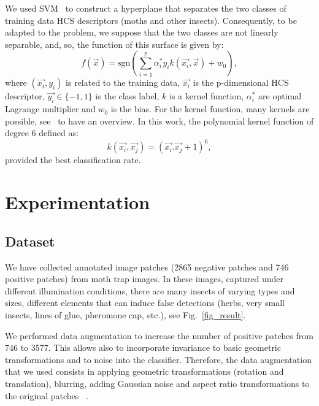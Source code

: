 \documentclass[a4paper,conference]{IEEEtran}
\begin{document}
We used SVM~\cite{cortes1995support} to construct a hyperplane that separates the two classes of training data HCS descriptors (moths and other insects).
Consequently, to be adapted to the problem, we suppose that the two classes are not linearly separable, and, so, the function of this surface is given by: 
\begin{equation}
    f(\vec{x}) = \text{sgn}(\sum_{i=1}^{p} \alpha_{i}^{*}y_{i}k(\vec{x_{i}},\vec{x})+w_{0}), 
\label{equation:f}
\end{equation}
where $(\vec{x_{i}} , y_{i} )$ is related to the training data, $\vec{x_{i}}$ is the p-dimensional HCS descriptor, $\vec{y_{i}} \in \{-1,1\}$ is the class label, $k$ is a kernel function, $\alpha_{i}^{*}$ are optimal Lagrange multiplier and $w_{0}$ is the bias. For the kernel function, many kernels are possible, see~\cite{cortes1995support} to have an overview. In this work, the polynomial kernel function of degree 6 defined as:
\begin{equation}
    k(\vec{x_{i}},\vec{x_{j}}) = (\vec{x_{i}}.\vec{x_{j}}+1)^6, 
\label{equation:k}
\end{equation}
provided the best classification rate.

\section{Experimentation}
\label{sec:experimentation}



\subsection{Dataset}

We have collected annotated image patches (2865 negative patches and 746 positive patches) from moth trap images. In these images, captured under different illumination conditions, there are many insects of varying types and sizes, different elements that can induce false detections (herbs, very small insects, lines of glue, pheromone cap, etc.), see Fig.~\ref{fig_result}. 

We performed data augmentation to increase the number of positive patches from 746 to 3577. This allows also to incorporate invariance to basic geometric transformations and to noise into the classifier. Therefore, the data augmentation that we used consists in applying geometric transformations (rotation and translation), blurring, adding Gaussian noise and aspect ratio transformations to the original patches ~\cite{DBLP:journals/corr/DingT16}. 
\end{document}
